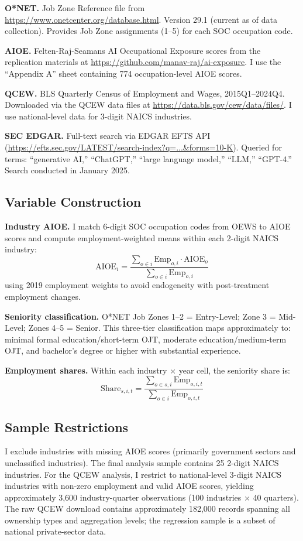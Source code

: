 \documentclass[12pt]{article}
\begin{document}
\textbf{O*NET.} Job Zone Reference file from \url{https://www.onetcenter.org/database.html}. Version 29.1 (current as of data collection). Provides Job Zone assignments (1--5) for each SOC occupation code.

\textbf{AIOE.} Felten-Raj-Seamans AI Occupational Exposure scores from the replication materials at \url{https://github.com/manav-raj/ai-exposure}. I use the ``Appendix A'' sheet containing 774 occupation-level AIOE scores.

\textbf{QCEW.} BLS Quarterly Census of Employment and Wages, 2015Q1--2024Q4. Downloaded via the QCEW data files at \url{https://data.bls.gov/cew/data/files/}. I use national-level data for 3-digit NAICS industries.

\textbf{SEC EDGAR.} Full-text search via EDGAR EFTS API (\url{https://efts.sec.gov/LATEST/search-index?q=...&forms=10-K}). Queried for terms: ``generative AI,'' ``ChatGPT,'' ``large language model,'' ``LLM,'' ``GPT-4.'' Search conducted in January 2025.

\subsection{Variable Construction}

\textbf{Industry AIOE.} I match 6-digit SOC occupation codes from OEWS to AIOE scores and compute employment-weighted means within each 2-digit NAICS industry:
$$\text{AIOE}_i = \frac{\sum_{o \in i} \text{Emp}_{o,i} \cdot \text{AIOE}_o}{\sum_{o \in i} \text{Emp}_{o,i}}$$
using 2019 employment weights to avoid endogeneity with post-treatment employment changes.

\textbf{Seniority classification.} O*NET Job Zones 1--2 = Entry-Level; Zone 3 = Mid-Level; Zones 4--5 = Senior. This three-tier classification maps approximately to: minimal formal education/short-term OJT, moderate education/medium-term OJT, and bachelor's degree or higher with substantial experience.

\textbf{Employment shares.} Within each industry $\times$ year cell, the seniority share is:
$$\text{Share}_{s,i,t} = \frac{\sum_{o \in s,i} \text{Emp}_{o,i,t}}{\sum_{o \in i} \text{Emp}_{o,i,t}}$$

\subsection{Sample Restrictions}

I exclude industries with missing AIOE scores (primarily government sectors and unclassified industries). The final analysis sample contains 25 2-digit NAICS industries. For the QCEW analysis, I restrict to national-level 3-digit NAICS industries with non-zero employment and valid AIOE scores, yielding approximately 3,600 industry-quarter observations (100 industries $\times$ 40 quarters). The raw QCEW download contains approximately 182,000 records spanning all ownership types and aggregation levels; the regression sample is a subset of national private-sector data.
\end{document}
